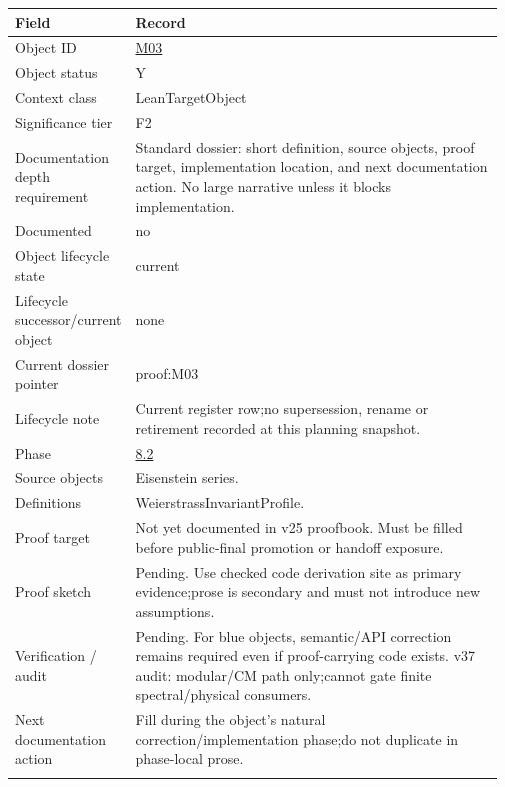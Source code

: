 \begin{longtable}{L{0.16\linewidth} L{0.81\linewidth}}
\hline
\textbf{Field} & \textbf{Record}\\
\hline
Object ID & \hyperlink{object-row-M03}{M03}\\
\hline\addlinespace[0.20em]
Object status & Y\\
\hline\addlinespace[0.20em]
Context class & LeanTargetObject\\
\hline\addlinespace[0.20em]
Significance tier & F2\\
\hline\addlinespace[0.20em]
Documentation depth requirement & Standard dossier: short definition, source objects, proof target, implementation location, and next documentation action. No large narrative unless it blocks implementation.\\
\hline\addlinespace[0.20em]
Documented & no\\
\hline\addlinespace[0.20em]
Object lifecycle state & current\\
\hline\addlinespace[0.20em]
Lifecycle successor/\allowbreak{}current object & none\\
\hline\addlinespace[0.20em]
Current dossier pointer & proof:M03\\
\hline\addlinespace[0.20em]
Lifecycle note & Current register row;\newline no supersession, rename or retirement recorded at this planning snapshot.\\
\hline\addlinespace[0.20em]
Phase & \hyperlink{phase-row-8-2}{8.2}\\
\hline\addlinespace[0.20em]
Source objects & Eisenstein series.\\
\hline\addlinespace[0.20em]
Definitions & WeierstrassInvariantProfile.\\
\hline\addlinespace[0.20em]
Proof target & Not yet documented in v25 proofbook. Must be filled before public-final promotion or handoff exposure.\\
\hline\addlinespace[0.20em]
Proof sketch & Pending. Use checked code derivation site as primary evidence;\newline prose is secondary and must not introduce new assumptions.\\
\hline\addlinespace[0.20em]
Verification /\allowbreak{} audit & Pending. For blue objects, semantic/\allowbreak{}API correction remains required even if proof-carrying code exists. v37 audit: modular/\allowbreak{}CM path only;\newline cannot gate finite spectral/\allowbreak{}physical consumers.\\
\hline\addlinespace[0.20em]
Next documentation action & Fill during the object's natural correction/\allowbreak{}implementation phase;\newline do not duplicate in phase-local prose.\\
\hline\addlinespace[0.20em]
\end{longtable}
